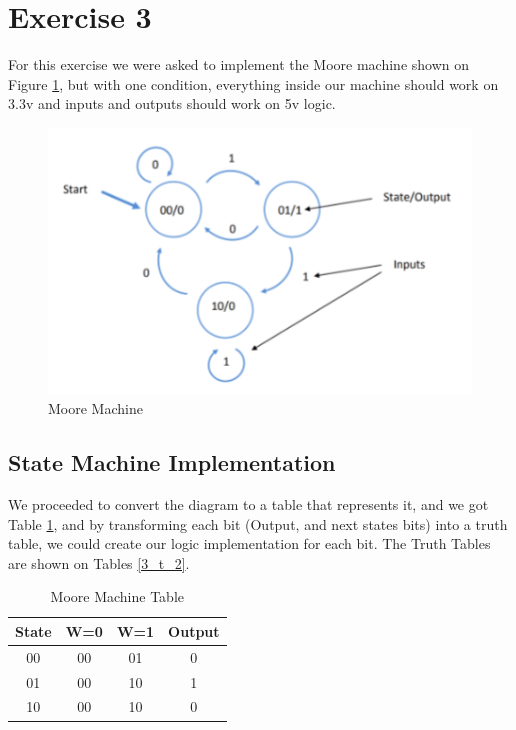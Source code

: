 

\section{\color{olive}Exercise 3}

For this exercise we were asked to implement the Moore machine shown
on Figure \ref{3_1}, but with one condition, everything inside our
machine should work on 3.3v and inputs and outputs should work on
5v logic.

\begin{figure}[H]
\begin{centering}
\includegraphics[scale=0.7]{../Exercise3/Assignment/images/Diagram}
\par\end{centering}
\caption{Moore Machine}
\label{3_1}
\end{figure}

\subsection{\color{purple}State Machine Implementation}

We proceeded to convert the diagram to a table that represents it,
and we got Table \ref{3_t_1}, and by transforming each bit (Output,
and next states bits) into a truth table, we could create our logic
implementation for each bit. The Truth Tables are shown on Tables
\ref{3_t_2}.

\begin{table}[H]
\begin{centering}
\begin{tabular}{|c|c|c|c|}
\hline 
State & W=0 & W=1 & Output\tabularnewline
\hline 
\hline 
00 & 00 & 01 & 0\tabularnewline
\hline 
01 & 00 & 10 & 1\tabularnewline
\hline 
10 & 00 & 10 & 0\tabularnewline
\hline 
\end{tabular}
\par\end{centering}
\caption{Moore Machine Table}
\label{3_t_1}

\end{table}


